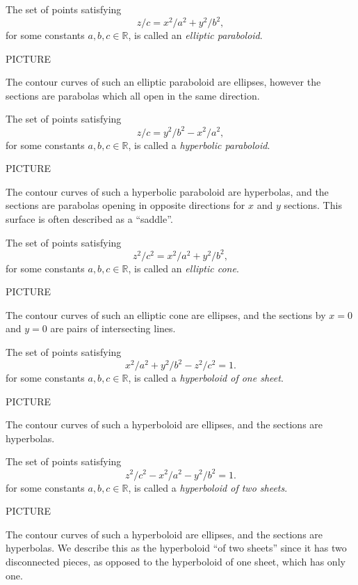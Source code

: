\documentclass{ximera}
\begin{document}
\begin{example}
The set of points satisfying
\[
z/c = x^2/a^2 + y^2/b^2,
\]
for some constants $a,b,c\in\mathbb{R}$, is called an \emph{elliptic paraboloid}.

PICTURE

The contour curves of such an elliptic paraboloid are ellipses, however the sections are parabolas which all open in the same direction.
\end{example}

\begin{example}
The set of points satisfying
\[
z/c = y^2/b^2 - x^2/a^2,
\]
for some constants $a,b,c\in\mathbb{R}$, is called a \emph{hyperbolic paraboloid}.

PICTURE

The contour curves of such a hyperbolic paraboloid are hyperbolas, and the sections are parabolas opening in opposite directions for $x$ and $y$ sections. This surface is often described as a ``saddle''.
\end{example}

\begin{example}
The set of points satisfying
\[
z^2/c^2 = x^2/a^2 + y^2/b^2,
\]
for some constants $a,b,c\in\mathbb{R}$, is called an \emph{elliptic cone}.

PICTURE

The contour curves of such an elliptic cone are ellipses, and the sections by $x=0$ and $y=0$ are pairs of intersecting lines.
\end{example}

\begin{example}
The set of points satisfying
\[
x^2/a^2 + y^2/b^2 - z^2/c^2 =1.
\]
for some constants $a,b,c\in\mathbb{R}$, is called a \emph{hyperboloid of one sheet}.

PICTURE

The contour curves of such a hyperboloid are ellipses, and the sections are hyperbolas.
\end{example}

\begin{example}
The set of points satisfying
\[
z^2/c^2 -x^2/a^2 - y^2/b^2 =1.
\]
for some constants $a,b,c\in\mathbb{R}$, is called a \emph{hyperboloid of two sheets}.

PICTURE

The contour curves of such a hyperboloid are ellipses, and the sections are hyperbolas. We describe this as the hyperboloid ``of two sheets'' since it has two disconnected pieces, as opposed to the hyperboloid of one sheet, which has only one.
\end{example}
\end{document}

